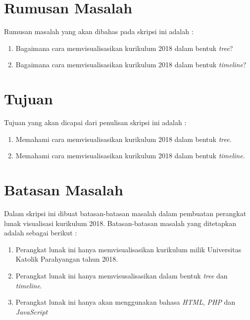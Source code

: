 \section{Rumusan Masalah}
\label{sec:rumusan}
Rumusan masalah yang akan dibahas pada skripsi ini adalah : 
\begin{enumerate}
    \item Bagaimana cara memvisualisasikan kurikulum 2018 dalam bentuk \textit{tree}?
    \item Bagaimana cara memvisualisasikan kurikulum 2018 dalam bentuk \textit{timeline}?
\end{enumerate}



\section{Tujuan}
\label{sec:tujuan}
Tujuan yang akan dicapai dari penulisan skripsi ini adalah : 
\begin{enumerate}
    \item Memahami cara memvisualisasikan kurikulum 2018 dalam bentuk \textit{tree}.
    \item Memahami cara memvisualisasikan kurikulum 2018 dalam bentuk \textit{timeline}.
\end{enumerate}



\section{Batasan Masalah}
\label{sec:batasan}
Dalam skripsi ini dibuat batasan-batasan masalah dalam pembuatan perangkat lunak visualisasi kurikulum 2018. Batasan-batasan masalah yang ditetapkan adalah sebagai berikut :
\begin{enumerate}
    \item Perangkat lunak ini hanya memvisualisasikan kurikulum milik Universitas Katolik Parahyangan tahun 2018.
    \item Perangkat lunak ini hanya memvisusalisasikan dalam bentuk \textit{tree} dan \textit{timeline}.
    \item Perangkat lunak ini hanya akan menggunakan bahasa \textit{HTML}, \textit{PHP} dan \textit{JavaScript}
\end{enumerate}



